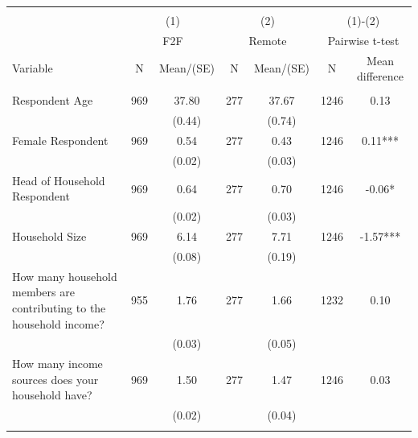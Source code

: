 
\begin{tabular}{@{\extracolsep{5pt}}lcccccc}
\\[-1.8ex]\hline \hline \\[-1.8ex]
 & \multicolumn{2}{c}{(1)}  & \multicolumn{2}{c}{(2)}  & \multicolumn{2}{c}{(1)-(2)} \\
 & \multicolumn{2}{c}{F2F}  & \multicolumn{2}{c}{Remote}  & \multicolumn{2}{c}{Pairwise t-test}  \\
Variable & N & Mean/(SE) & N & Mean/(SE) & N & Mean difference \\ \hline \\[-1.8ex] 
Respondent Age   & 969    & 37.80    & 277    & 37.67    & 1246    & 0.13   \\
 &   & (0.44)  &   & (0.74)  &   &  \\ [1ex]
Female Respondent   & 969    & 0.54    & 277    & 0.43    & 1246    & 0.11***   \\
 &   & (0.02)  &   & (0.03)  &   &  \\ [1ex]
Head of Household Respondent   & 969    & 0.64    & 277    & 0.70    & 1246    & -0.06*   \\
 &   & (0.02)  &   & (0.03)  &   &  \\ [1ex]
Household Size   & 969    & 6.14    & 277    & 7.71    & 1246    & -1.57***   \\
 &   & (0.08)  &   & (0.19)  &   &  \\ [1ex]
How many household members are contributing to the household income?   & 955    & 1.76    & 277    & 1.66    & 1232    & 0.10   \\
 &   & (0.03)  &   & (0.05)  &   &  \\ [1ex]
How many income sources does your household have?   & 969    & 1.50    & 277    & 1.47    & 1246    & 0.03   \\
 &   & (0.02)  &   & (0.04)  &   &  \\ [1ex]
\hline \hline \\[-1.8ex]

\end{tabular}
